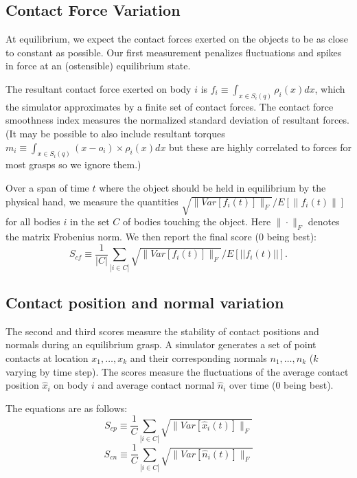 \subsection{Contact Force Variation}

At equilibrium, we expect the contact forces exerted on the objects to be as close to constant as possible. Our first measurement penalizes fluctuations and spikes in force at an (ostensible) equilibrium state. 

The resultant contact force exerted on body $i$  is $f_i \equiv \int_{x\in S_i(q)} \rho_i(x) dx$, which the simulator approximates by a finite set of contact forces.  The contact force smoothness index measures the normalized standard deviation of resultant forces. (It may be possible to also include resultant torques  $m_i \equiv \int_{x\in S_i(q)} (x-o_i) \times \rho_i(x) dx$ but these are highly correlated to forces for most grasps so we ignore them.) 

Over a span of time $t$ where the object should be held in equilibrium by the physical hand, we measure the quantities $\sqrt{\|Var[f_i(t)]\|_F} / E[\|f_i(t)\|]$ for all bodies $i$ in the set $C$ of bodies touching the object.  Here $\|\cdot\|_F$ denotes the matrix Frobenius norm. We then report the final score (0 being best):
\begin{equation}
S_{cf} \equiv \frac{1}{|C|} \sum_{|i\in C|} \sqrt{\|Var[f_i(t)]\|_F} / E[||f_i(t)||].
\end{equation}

\subsection{Contact position and normal variation}
The second and third scores measure the stability of contact positions and normals during an equilibrium grasp.  A simulator generates a set of point contacts at location $x_1,\ldots,x_k$ and their corresponding normals $n_1,\ldots,n_k$ ($k$ varying by time step).  The scores measure the fluctuations of the average contact position $\hat{x}_i$ on body $i$ and average contact normal $\hat{n}_i$ over time (0 being best).

The equations are as follows:
\begin{equation}
S_{cp} \equiv \frac{1}{C} \sum_{|i\in C|} \sqrt{\|Var[\hat{x}_i(t)]\|_F}
\end{equation}
\begin{equation}
S_{cn} \equiv \frac{1}{C} \sum_{|i\in C|} \sqrt{\|Var[\hat{n}_i(t)]\|_F}
\end{equation}

